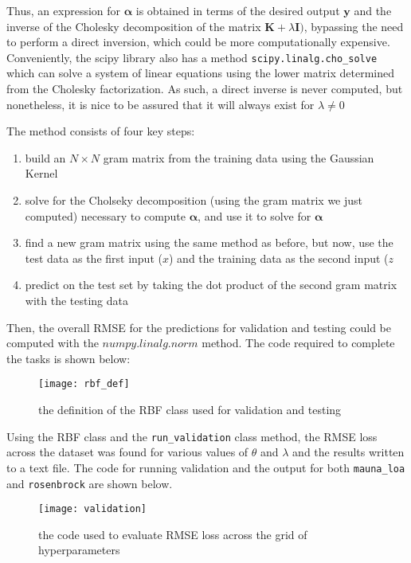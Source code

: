 Thus, an expression for $\boldsymbol\alpha$ is obtained in terms of the desired output $\mathbf{y}$ and the inverse of the Cholesky decomposition of the matrix $\mathbf{K} + \lambda \mathbf{I})$, bypassing the need to perform a direct inversion, which could be more computationally expensive. Conveniently, the scipy library also has a method \verb+scipy.linalg.cho_solve+ which can solve a system of linear equations using the lower matrix determined from the Cholesky factorization. As such, a direct inverse is never computed, but nonetheless, it is nice to be assured that it will always exist for $\lambda \neq 0$

The method consists of four key steps:
\begin{enumerate}
\item build an $N \times N$ gram matrix from the training data using the Gaussian Kernel
\item solve for the Cholseky decomposition (using the gram matrix we just computed) necessary to compute $\boldsymbol\alpha$, and use it to solve for $\boldsymbol\alpha$
\item find a new gram matrix using the same method as before, but now, use the test data as the first input ($x$) and the training data as the second input ($z$
\item predict on the test set by taking the dot product of the second gram matrix with the testing data
\end{enumerate}

Then, the overall RMSE for the predictions for validation and testing could be computed with the $numpy.linalg.norm$ method. The code required to complete the tasks is shown below:


\begin{figure}[H]
\centering
\texttt{[image: rbf\_def]}
\caption{the definition of the RBF class used for validation and testing}
\end{figure}

Using the RBF class and the \verb+run_validation+ class method, the RMSE loss across the dataset was found for various values of $\theta$ and $\lambda$ and the results written to a text file. The code for running validation and the output for both \verb+mauna_loa+ and \verb+rosenbrock+ are shown below.

\begin{figure}[H]
\centering
\texttt{[image: validation]}
\caption{the code used to evaluate RMSE loss across the grid of hyperparameters}
\end{figure}

